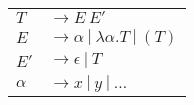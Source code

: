 \documentclass[convert={density=300,size=1080x800,outext=.png}]{standalone}
\begin{document}
\begin{tabular}{l@{ }l}
  $ T $ & $ \rightarrow E \ E' $ \\
  $ E $ & $ \rightarrow \alpha \ | \ \lambda \alpha . T \ | \ (T) $ \\
  $ E' $ & $ \rightarrow \epsilon \ | \ T $ \\
  $ \alpha $ & $ \rightarrow x \ | \ y \ | \ \dots $
\end{tabular}
\end{document}
